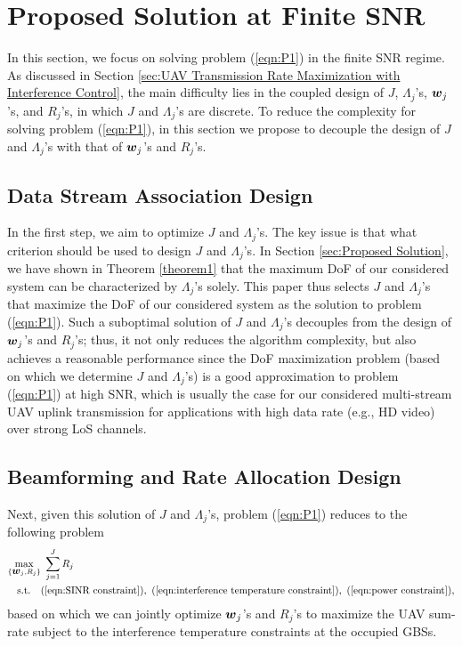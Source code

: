 \documentclass[onecolumn, draftclsnofoot, 12pt]{IEEEtran}
\newcommand{\mv}[1]{\mbox{\boldmath{$ #1 $}}}
\begin{document}
\section{Proposed Solution at Finite SNR}\label{sec:Proposed Solution in Finite SNR Regime}
In this section, we focus on solving problem (\ref{eqn:P1}) in the finite SNR regime. As discussed in Section \ref{sec:UAV Transmission Rate Maximization with Interference Control}, the main difficulty lies in the coupled design of $J$, $\Lambda_j$'s, $\mv{w}_j$'s, and $R_j$'s, in which $J$ and $\Lambda_j$'s are discrete. To reduce the complexity for solving problem (\ref{eqn:P1}), in this section we propose to decouple the design of $J$ and $\Lambda_j$'s with that of $\mv{w}_j$'s and $R_j$'s.

\subsection{Data Stream Association Design}
In the first step, we aim to optimize $J$ and $\Lambda_j$'s. The key issue is that what criterion should be used to design $J$ and $\Lambda_j$'s. In Section \ref{sec:Proposed Solution}, we have shown in Theorem \ref{theorem1} that the maximum DoF of our considered system can be characterized by $\Lambda_j$'s solely. This paper thus selects $J$ and $\Lambda_j$'s that maximize the DoF of our considered system as the solution to problem (\ref{eqn:P1}). Such a suboptimal solution of $J$ and $\Lambda_j$'s decouples from the design of $\mv{w}_j$'s and $R_j$'s; thus, it not only reduces the algorithm complexity, but also achieves a reasonable performance since the DoF maximization problem (based on which we determine $J$ and $\Lambda_j$'s) is a good approximation to problem (\ref{eqn:P1}) at high SNR, which is usually the case for our considered multi-stream UAV uplink transmission for applications with high data rate (e.g., HD video) over strong LoS channels.

\subsection{Beamforming and Rate Allocation Design}
Next, given this solution of $J$ and $\Lambda_j$'s, problem (\ref{eqn:P1}) reduces to the following problem
\begin{subequations}\label{eqn:P4}\begin{align}
\mathop{ \underset{\{\mv{w}_j,R_j\}}{\max}} & ~ \sum\limits_{j=1}^J  R_j \label{eqn:problem 4}\\
\mathrm{s.t.} \ \ \ & ({\rm \ref{eqn:SINR constraint}}), ~ ({\rm \ref{eqn:interference temperature constraint}}), ~ ({\rm \ref{eqn:power constraint}}),
\end{align}\end{subequations}based on which we can jointly optimize $\mv{w}_j$'s and $R_j$'s to maximize the UAV sum-rate subject to the interference temperature constraints at the occupied GBSs.
\end{document}
